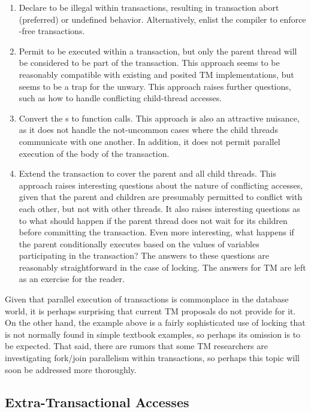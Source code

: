 \begin{enumerate}
\item	Declare  to be illegal within transactions,
	resulting in transaction abort (preferred) or undefined
	behavior. Alternatively, enlist the compiler to enforce
	-free transactions.
\item	Permit  to be executed within a
	transaction, but only the parent thread will be considered to
	be part of the transaction.
	This approach seems to be reasonably compatible with existing and
	posited TM implementations, but seems to be a trap for the unwary.
	This approach raises further questions, such as how to handle
	conflicting child-thread accesses.
\item	Convert the s to function calls.
	This approach is also an attractive nuisance, as it does not
	handle the not-uncommon cases where the child threads communicate
	with one another.
	In addition, it does not permit parallel execution of the body
	of the transaction.
\item	Extend the transaction to cover the parent and all child threads.
	This approach raises interesting questions about the nature of
	conflicting accesses, given that the parent and children are
	presumably permitted to conflict with each other, but not with
	other threads.
	It also raises interesting questions as to what should happen
	if the parent thread does not wait for its children before
	committing the transaction.
	Even more interesting, what happens if the parent conditionally
	executes  based on the values of variables
	participating in the transaction?
	The answers to these questions are reasonably straightforward
	in the case of locking.
	The answers for TM are left as an exercise for the reader. 
\end{enumerate}

Given that parallel execution of transactions is commonplace in the
database world, it is perhaps surprising that current TM proposals do
not provide for it.
On the other hand, the example above is a fairly sophisticated use
of locking that is not normally found in simple textbook examples,
so perhaps its omission is to be expected.
That said, there are rumors that some TM researchers are investigating
fork/join parallelism within transactions, so perhaps this topic will
soon be addressed more thoroughly.

\subsection{Extra-Transactional Accesses}
\label{sec:future:Extra-Transactional Accesses}

